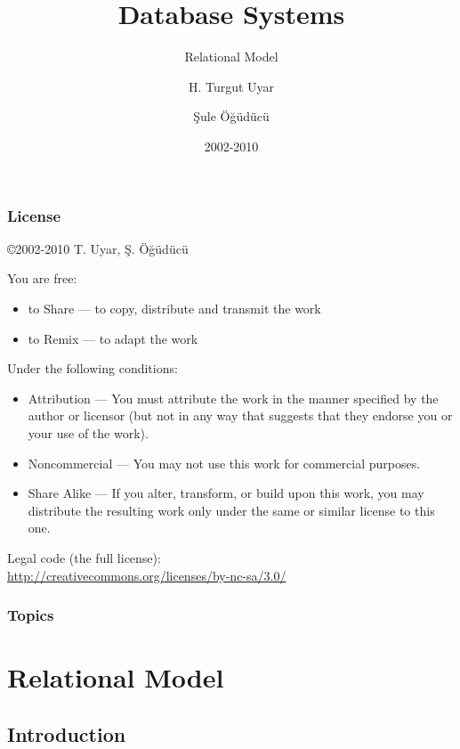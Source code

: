 \documentclass[dvipsnames]{beamer}
\title{Database Systems}
\subtitle{Relational Model}
\author{H. Turgut Uyar \and Şule Öğüdücü}
\date{2002-2010}
\theoremstyle{plain}
\begin{document}
\begin{frame}
  \titlepage
\end{frame}

\begin{frame}
  \frametitle{License}

  \hfill
  \copyright 2002-2010 T. Uyar, Ş. Öğüdücü

  \vfill
  \begin{tiny}
    You are free:
    \begin{itemize}
      \item to Share — to copy, distribute and transmit the work
      \item to Remix — to adapt the work
    \end{itemize}

    Under the following conditions:
    \begin{itemize}
      \item Attribution — You must attribute the work in the manner specified by
        the author or licensor (but not in any way that suggests that they
        endorse you or your use of the work).

      \item Noncommercial — You may not use this work for commercial purposes.

      \item Share Alike — If you alter, transform, or build upon this work, you
        may distribute the resulting work only under the same or similar license
        to this one.
    \end{itemize}
  \end{tiny}

  \vfill
  Legal code (the full license):\\
  \url{http://creativecommons.org/licenses/by-nc-sa/3.0/}
\end{frame}

\begin{frame}
  \frametitle{Topics}
  \tableofcontents
\end{frame}

\section{Relational Model}

\subsection{Introduction}
\end{document}
